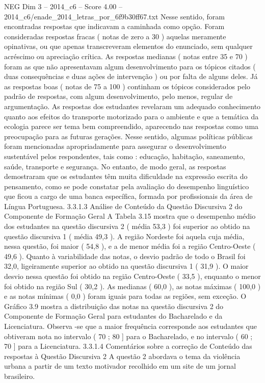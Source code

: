 \begin{textsample}{NEG Dim 3 – 2014\_c6 – Score 4.00 – 2014\_c6/enade\_2014\_letras\_por\_6f9b30ff67.txt}
Nesse sentido, foram encontradas respostas que indicavam a caminhada como opção.
Foram consideradas respostas fracas ( notas de zero a 30 ) aquelas meramente opinativas, ou que apenas transcreveram elementos do enunciado, sem qualquer acréscimo ou apreciação crítica.
As respostas medianas ( notas entre 35 e 70 ) foram as que não apresentavam algum desenvolvimento para os tópicos citados ( duas consequências e duas ações de intervenção ) ou por falta de alguns deles.
Já as respostas boas ( notas de 75 a 100 ) continham os tópicos considerados pelo padrão de respostas, com algum desenvolvimento, pelo menos, regular de argumentação.
As respostas dos estudantes revelaram um adequado conhecimento quanto aos efeitos do transporte motorizado para o ambiente e que a temática da ecologia parece ser tema bem compreendido, aparecendo nas respostas como uma preocupação para as futuras gerações.
Nesse sentido, algumas políticas públicas foram mencionadas apropriadamente para assegurar o desenvolvimento sustentável pelos respondentes, tais como : educação, habitação, saneamento, saúde, transporte e segurança.
No entanto, de modo geral, as respostas demostraram que os estudantes têm muita dificuldade na expressão escrita do pensamento, como se pode constatar pela avaliação do desempenho linguístico que ficou a cargo de uma banca específica, formada por profissionais da área de Língua Portuguesa. 3.3.1.3 Análise de Conteúdo da Questão Discursiva 2 do Componente de Formação Geral A Tabela 3.15 mostra que o desempenho médio dos estudantes na questão discursiva 2 ( média 53,3 ) foi superior ao obtido na questão discursiva 1 ( média 49,3 ).
A região Nordeste foi aquela cuja média, nessa questão, foi maior ( 54,8 ), e a de menor média foi a região Centro-Oeste ( 49,6 ).
Quanto à variabilidade das notas, o desvio padrão de todo o Brasil foi 32,0, ligeiramente superior ao obtido na questão discursiva 1 ( 31,9 ).
O maior desvio nessa questão foi obtido na região Centro-Oeste ( 33,5 ), enquanto o menor foi obtido na região Sul ( 30,2 ).
As medianas ( 60,0 ), as notas máximas ( 100,0 ) e as notas mínimas ( 0,0 ) foram iguais para todas as regiões, sem exceção.
O Gráfico 3.9 mostra a distribuição das notas na questão discursiva 2 do Componente de Formação Geral para estudantes do Bacharelado e da Licenciatura.
Observa -se que a maior frequência corresponde aos estudantes que obtiveram nota no intervalo ( 70 ; 80 ] para o Bacharelado, e no intervalo ( 60 ; 70 ] para a Licenciatura. 3.3.1.4 Comentários sobre a correção de Conteúdo das respostas à Questão Discursiva 2 A questão 2 abordava o tema da violência urbana a partir de um texto motivador recolhido em um site de um jornal brasileiro.

\end{textsample}
